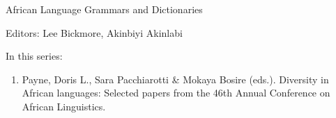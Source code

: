 {\large African Language Grammars and Dictionaries}

\bigskip

Editors:  Lee Bickmore,  Akinbiyi Akinlabi


\bigskip

In this series:

\begin{enumerate}
\item Payne, Doris L., Sara Pacchiarotti \& Mokaya Bosire (eds.). Diversity in African languages: Selected papers from the 46th Annual Conference on African Linguistics.
\end{enumerate}


\vfill

